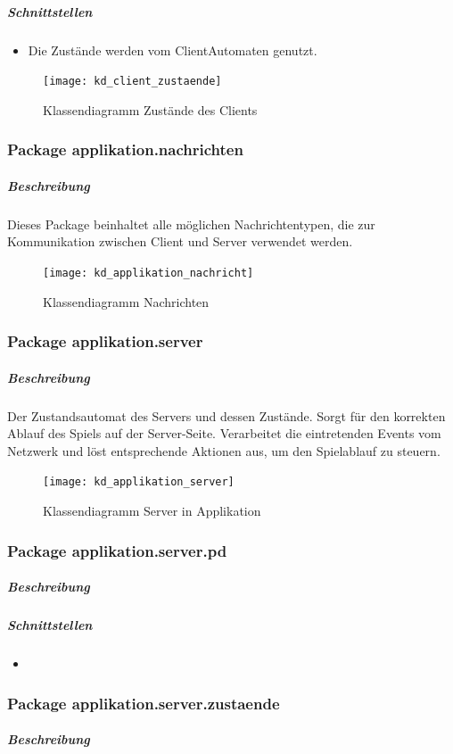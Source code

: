 \documentclass[12pt,halfparskip]{scrartcl}
\begin{document}
		\subparagraph{Schnittstellen}
		\begin{itemize}
			\item Die Zustände werden vom ClientAutomaten genutzt.
		\end{itemize}
		
		\begin{figure}[h]
			\centering
			\texttt{[image: kd\_client\_zustaende]}
			\caption{Klassendiagramm Zustände des Clients}
			\label{fig:kd_client_zustaende}
		\end{figure}
	
\subsubsection{Package applikation.nachrichten}
	\subparagraph{Beschreibung}
	Dieses Package beinhaltet alle möglichen Nachrichtentypen, die zur Kommunikation zwischen Client und Server verwendet werden.
	\begin{figure}[h]
		\centering
		\texttt{[image: kd\_applikation\_nachricht]}
		\caption{Klassendiagramm Nachrichten}
		\label{fig:kd_applikation_nachricht}
	\end{figure}

\subsubsection{Package applikation.server}
	\subparagraph{Beschreibung}
	Der Zustandsautomat des Servers und dessen Zustände. Sorgt für den korrekten Ablauf des Spiels auf der Server-Seite. Verarbeitet die eintretenden Events vom Netzwerk und löst entsprechende Aktionen aus, um den Spielablauf zu steuern.

	\begin{figure}[h]
		\centering
		\texttt{[image: kd\_applikation\_server]}
		\caption{Klassendiagramm Server in Applikation}
		\label{fig:kd_applikation_server}
	\end{figure}
	
	\subsubsection{Package applikation.server.pd}
		\subparagraph{Beschreibung}

		\subparagraph{Schnittstellen}
		\begin{itemize}
			\item 
		\end{itemize}
	
	\subsubsection{Package applikation.server.zustaende}
		\subparagraph{Beschreibung}
\end{document}
